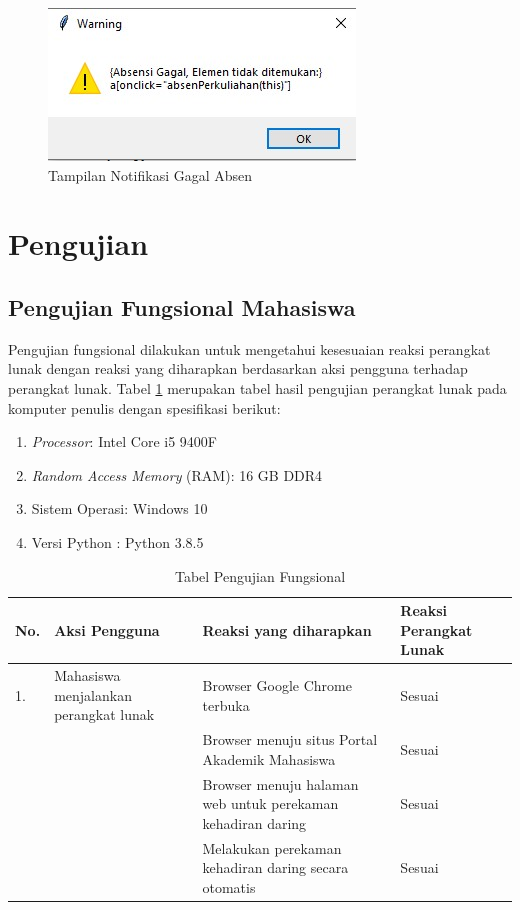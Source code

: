 \begin{figure}[H]
	\centering
	\includegraphics[scale=0.7]{Gambar/gagalAbsen.jpg}
	\caption{Tampilan Notifikasi Gagal Absen} 
	\label{fig:absenGagal}
\end{figure}

\section{Pengujian}
\label{sec:pengujian} 

\subsection{Pengujian Fungsional Mahasiswa}
Pengujian fungsional dilakukan untuk mengetahui kesesuaian reaksi perangkat lunak dengan reaksi yang diharapkan berdasarkan aksi pengguna terhadap perangkat lunak. Tabel \ref{tab:fungsi} merupakan tabel hasil pengujian perangkat lunak pada komputer penulis dengan spesifikasi berikut:
\begin{enumerate}
	\item \textit{Processor}: Intel Core i5 9400F
	\item \textit{Random Access Memory} (RAM): 16 GB DDR4
	\item Sistem Operasi: Windows 10
	\item Versi Python : Python 3.8.5
\end{enumerate}

\begin{table}[H]			
	\caption{Tabel Pengujian Fungsional}
	\centering
	\begin{tabular}{|p{0.5cm} |p{4cm} |p{5.5cm}| p{3cm}|} \hline
		No. & Aksi Pengguna & Reaksi yang diharapkan & Reaksi Perangkat Lunak\\ \hline     
		1. 	& Mahasiswa menjalankan perangkat lunak & Browser Google Chrome terbuka & Sesuai\\ \hline 
	 		& &  Browser menuju situs Portal Akademik Mahasiswa & Sesuai\\ \hline 
			& &  Browser menuju halaman web untuk perekaman kehadiran daring & Sesuai\\ \hline 
			& &  Melakukan perekaman kehadiran daring secara otomatis & Sesuai\\ \hline
	\end{tabular}
	\label{tab:fungsi}
\end{table}

